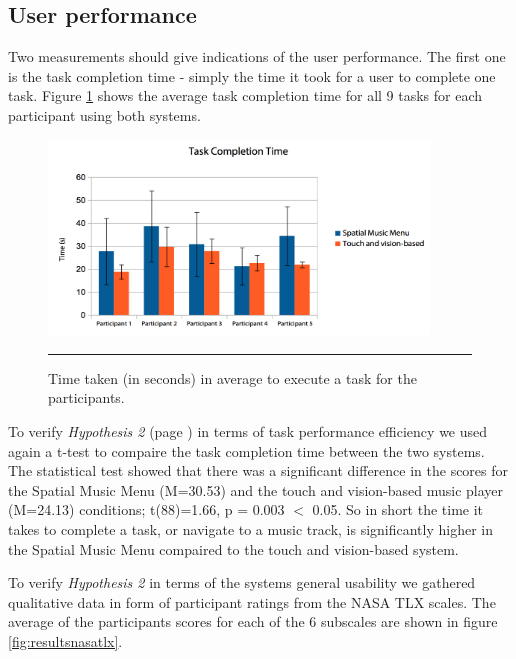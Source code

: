 \subsection{User performance}
Two measurements should give indications of the user performance. The first one is the task completion time - simply the time it took for a user to complete one task. Figure \ref{fig:resultstasktime} shows the average task completion time for all 9 tasks for each participant using both systems.

\begin{figure}[h]
	\centering
		\includegraphics[width=0.9\textwidth,height=\textheight,keepaspectratio]{./Figures/results_tasktime.png}
		\rule{35em}{1pt}
	\caption[Results task time]{Time taken (in seconds) in average to execute a task for the participants.}
	\label{fig:resultstasktime}
\end{figure}

To verify \textit{Hypothesis 2} (page \pageref{sec:evaluationhypothesis}) in terms of task performance efficiency we used again a t-test to compaire the task completion time between the two systems. The statistical test showed that there was a significant difference in the scores for the Spatial Music Menu (M=30.53) and the touch and vision-based music player (M=24.13) conditions; t(88)=1.66, p = 0.003 $<$ 0.05. So in short the time it takes to complete a task, or navigate to a music track, is significantly higher in the Spatial Music Menu compaired to the touch and vision-based system.

To verify \textit{Hypothesis 2} in terms of the systems general usability we gathered qualitative data in form of participant ratings from the NASA TLX scales. The average of the participants scores for each of the 6 subscales are shown in figure \ref{fig:resultsnasatlx}.

